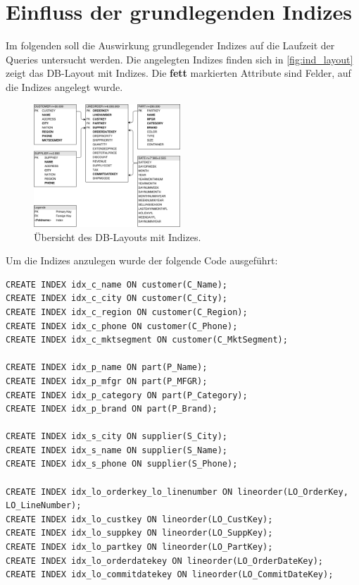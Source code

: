 \section{Einfluss der grundlegenden Indizes}\label{auswertung:basic_indizes}

Im folgenden soll die Auswirkung grundlegender Indizes auf die Laufzeit der Queries untersucht werden. Die angelegten Indizes finden sich in 
\autoref{fig:ind_layout} zeigt das DB-Layout mit Indizes. Die \textbf{fett} markierten Attribute sind Felder, auf die Indizes angelegt wurde.



\begin{figure}[H]
    \centering
    \includegraphics[width=0.49\textwidth]{images/ssbm_basic}
    \caption{Übersicht des DB-Layouts mit Indizes.}
	\label{fig:ind_layout}
\end{figure}

Um die Indizes anzulegen wurde der folgende Code ausgeführt:
\begin{Verbatim}
CREATE INDEX idx_c_name ON customer(C_Name);
CREATE INDEX idx_c_city ON customer(C_City);
CREATE INDEX idx_c_region ON customer(C_Region);
CREATE INDEX idx_c_phone ON customer(C_Phone);
CREATE INDEX idx_c_mktsegment ON customer(C_MktSegment);

CREATE INDEX idx_p_name ON part(P_Name);
CREATE INDEX idx_p_mfgr ON part(P_MFGR);
CREATE INDEX idx_p_category ON part(P_Category);
CREATE INDEX idx_p_brand ON part(P_Brand);

CREATE INDEX idx_s_city ON supplier(S_City);
CREATE INDEX idx_s_name ON supplier(S_Name);
CREATE INDEX idx_s_phone ON supplier(S_Phone);

CREATE INDEX idx_lo_orderkey_lo_linenumber ON lineorder(LO_OrderKey, LO_LineNumber);
CREATE INDEX idx_lo_custkey ON lineorder(LO_CustKey);
CREATE INDEX idx_lo_suppkey ON lineorder(LO_SuppKey);
CREATE INDEX idx_lo_partkey ON lineorder(LO_PartKey);
CREATE INDEX idx_lo_orderdatekey ON lineorder(LO_OrderDateKey);
CREATE INDEX idx_lo_commitdatekey ON lineorder(LO_CommitDateKey);
\end{Verbatim}

